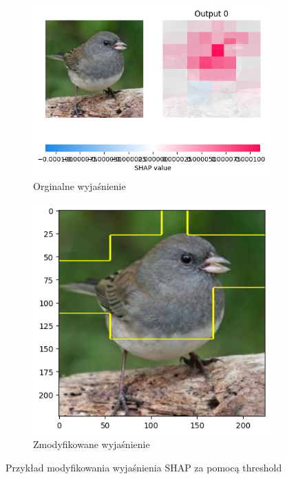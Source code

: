 \begin{figure}
	\centering
	\begin{subfigure}[b]{0.45\textwidth}
		\includegraphics[width=.9\textwidth]{img/parameters/shap/threshold_base}
		\caption{Orginalne wyjaśnienie}  \label{rys:parameters_lime_numsamples_5}
	\end{subfigure}
	\begin{subfigure}[b]{0.45\textwidth}
		\centering\includegraphics[width=.9\textwidth]{img/parameters/shap/threshold_mean}
		\caption{Zmodyfikowane wyjaśnienie}  \label{rys:parameters_lime_numsamples_1000}
	\end{subfigure}
	\caption{Przykład modyfikowania wyjaśnienia SHAP za pomocą threshold}
\end{figure}

